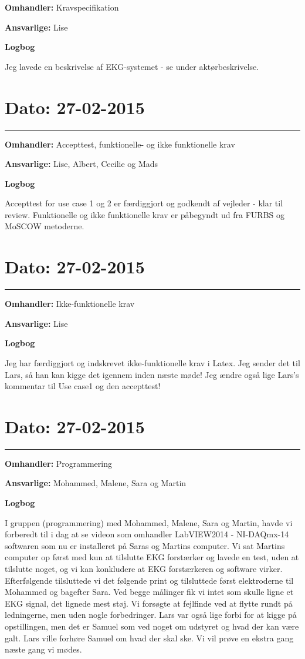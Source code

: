 \textbf{Omhandler:} Kravspecifikation

\textbf{Ansvarlige:} Lise

\textbf{Logbog}

Jeg lavede en beskrivelse af EKG-systemet - se under aktørbeskrivelse. 


\section{Dato: 27-02-2015}
\hrule

\textbf{Omhandler:} Accepttest, funktionelle- og ikke funktionelle krav

\textbf{Ansvarlige:} Lise, Albert, Cecilie og Mads
 
\textbf{Logbog}

Accepttest for use case 1 og 2 er færdiggjort og godkendt af vejleder - klar til review.
Funktionelle og ikke funktionelle krav er påbegyndt ud fra FURBS og MoSCOW metoderne. 


\section{Dato: 27-02-2015}
\hrule

\textbf{Omhandler:} Ikke-funktionelle krav

\textbf{Ansvarlige:} Lise 
 
\textbf{Logbog}

Jeg har færdiggjort og indskrevet ikke-funktionelle krav i Latex. Jeg sender det til Lars, så han kan kigge det igennem inden næste møde! Jeg ændre også lige Lars's kommentar til Use case1 og den accepttest! 

\section{Dato: 27-02-2015}
\hrule 

\textbf{Omhandler:} Programmering

\textbf{Ansvarlige:} Mohammed, Malene, Sara og Martin

\textbf{Logbog}

I gruppen (programmering) med Mohammed, Malene, Sara og Martin, havde vi forberedt til i dag at se videon som omhandler LabVIEW2014 - NI-DAQmx-14 softwaren som nu er installeret på Saras og Martins computer. Vi sat Martins computer op først med kun at tilslutte EKG forstærker og lavede en test, uden at tilslutte noget, og vi kan konkludere at EKG forstærkeren og software virker. Efterfølgende tilsluttede vi det følgende print og tilsluttede først elektroderne til Mohammed og bagefter Sara. Ved begge målinger fik vi intet som skulle ligne et EKG signal, det lignede mest støj. Vi forsøgte at fejlfinde ved at flytte rundt på ledningerne, men uden nogle forbedringer. Lars var også lige forbi for at kigge på opstillingen, men det er Samuel som ved noget om udstyret og hvad der kan være galt. Lars ville forhøre Samuel om hvad der skal ske. Vi vil prøve en ekstra gang næste gang vi mødes.


